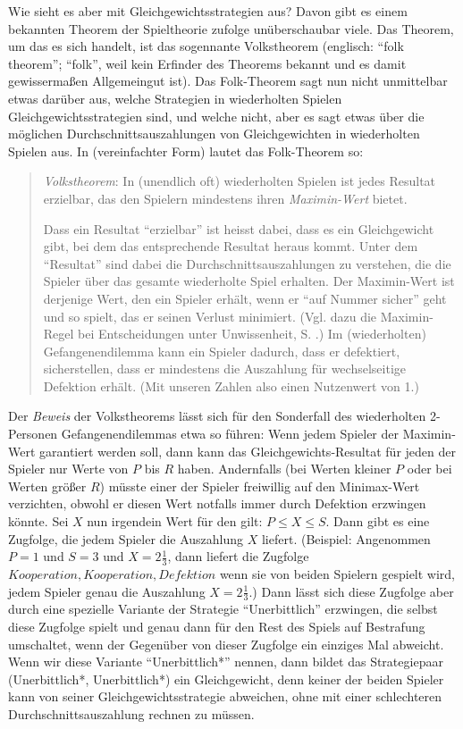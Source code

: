 Wie sieht es aber mit Gleichgewichtsstrategien aus? Davon gibt es einem
bekannten Theorem der Spieltheorie zufolge unüberschaubar viele. Das Theorem,
um das es sich handelt, ist das sogennante Volkstheorem (englisch: "`folk
theorem"'; "`folk"', weil kein Erfinder des Theorems bekannt und es damit
gewissermaßen Allgemeingut ist). Das Folk-Theorem sagt nun nicht unmittelbar 
etwas darüber aus, welche Strategien in
wiederholten Spielen Gleichgewichtsstrategien sind, und welche nicht, aber es
sagt etwas über die möglichen Durchschnittsauszahlungen von Gleichgewichten in
wiederholten Spielen aus. In (vereinfachter Form) lautet das Folk-Theorem so:
\begin{quote}
{\em Volkstheorem}: In (unendlich oft) wiederholten Spielen ist jedes Resultat
erzielbar, das den Spielern mindestens ihren {\em Maximin-Wert} bietet.

{\footnotesize Dass ein Resultat "`erzielbar"' ist heisst dabei, dass es ein
Gleichgewicht gibt, bei dem das entsprechende Resultat heraus kommt. Unter dem "`Resultat"' sind dabei die
Durchschnittsauszahlungen zu verstehen, die die Spieler über das gesamte
wiederholte Spiel erhalten. Der Maximin-Wert ist derjenige Wert, den ein
Spieler erhält, wenn er "`auf Nummer sicher"' geht und so spielt, das er seinen
Verlust minimiert. (Vgl. dazu die Maximin-Regel bei Entscheidungen unter
Unwissenheit, S. \pageref{maximinRegel}.) Im (wiederholten) Gefangenendilemma
kann ein Spieler dadurch, dass er defektiert, sicherstellen, dass er mindestens
die Auszahlung für wechselseitige Defektion erhält. (Mit unseren Zahlen also
einen Nutzenwert von 1.)}
\end{quote}
Der {\em Beweis} der Volkstheorems lässt sich für den Sonderfall des
wiederholten 2-Personen Gefangenendilemmas etwa so führen: Wenn jedem Spieler
der Maximin-Wert garantiert werden soll, dann kann das Gleichgewichts-Resultat
für jeden der Spieler nur Werte von $P$ bis $R$ haben. Andernfalls (bei Werten
kleiner $P$ oder bei Werten größer $R$) müsste einer der Spieler freiwillig
auf den Minimax-Wert verzichten, obwohl er diesen Wert notfalls immer durch
Defektion erzwingen könnte. Sei $X$ nun irgendein Wert für den gilt: $P \leq X
\leq S$. Dann gibt es eine Zugfolge, die jedem Spieler die Auszahlung $X$ liefert.
(Beispiel: Angenommen $P=1$ und $S=3$ und $X=2\frac{1}{3}$, dann liefert die
Zugfolge $Kooperation, Kooperation, Defektion$ wenn sie von beiden Spielern
gespielt wird, jedem Spieler genau die Auszahlung $X=2\frac{1}{3}$.) Dann lässt
sich diese Zugfolge aber durch eine spezielle Variante der Strategie
"`Unerbittlich"' erzwingen, die selbst diese Zugfolge spielt und genau dann 
für den Rest des Spiels auf Bestrafung umschaltet, wenn der Gegenüber von
dieser Zugfolge ein einziges Mal abweicht. Wenn wir diese Variante
"`Unerbittlich*"' nennen, dann bildet das Strategiepaar (Unerbittlich*,
Unerbittlich*) ein Gleichgewicht, denn keiner der beiden Spieler kann von
seiner Gleichgewichtsstrategie abweichen, ohne mit einer schlechteren 
Durchschnittsauszahlung rechnen zu müssen.


